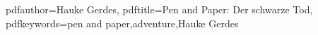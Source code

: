
\newcommand{\adventurename}{Der schwarze Tod}
\newcommand{\mainauthor}{Hauke Gerdes}
\newcommand{\coauthor}{Paul Filip}

\newcommand{\ruleset}{How to be a hero}
\newcommand{\ruleseturl}{www.howtobeahero.de}

\newcommand{\place}{mittelalterliches Hamburg}
\newcommand{\storytime}{1350 n. Chr.}
\newcommand{\playercount}{3 - 5}
\newcommand{\difficulty}{einfach}
\newcommand{\duration}{3-4 Stunden}

\hypersetup
{
	pdfauthor={\mainauthor},
	pdftitle={Pen and Paper: \adventurename},
	pdfkeywords={pen and paper,adventure,\mainauthor}
}
